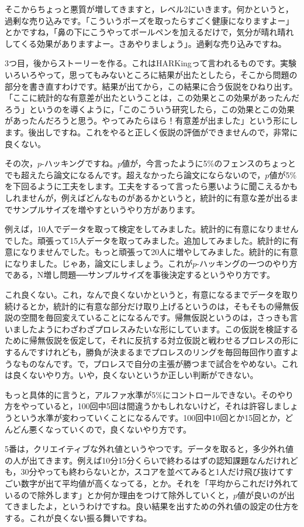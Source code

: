 \documentclass{ltjsbook}
\begin{document}
そこからちょっと悪質が増してきますと，レベル2にいきます。何かというと，過剰な売り込みです。「こういうポーズを取ったらすごく健康になりますよー」とかですね，「鼻の下にこうやってボールペンを加えるだけで，気分が晴れ晴れしてくる効果がありますよー。さあやりましょう」。過剰な売り込みですね。

3つ目，後からストーリーを作る。これはHARKingって言われるものです。実験いろいろやって，思ってもみないところに結果が出たとしたら，そこから問題の部分を書き直すわけです。結果が出てから，この結果に合う仮説をひねり出す。「ここに統計的な有意差が出たということは，この効果とこの効果があったんだろう」というのを導くように，「このこういう研究したら，この効果とこの効果があったんだろうと思う。やってみたらほら！有意差が出ました」という形にします。後出しですね。これをやると正しく仮説の評価ができませんので，非常に良くない。

その次，$p$-ハッキングですね。$p$値が，今言ったように5\%のフェンスのちょっとでも超えたら論文になるんです。超えなかったら論文にならないので，$p$値が5\%を下回るように工夫をします。工夫をするって言ったら悪いように聞こえるかもしれませんが，例えばどんなものがあるかというと，統計的に有意な差が出るまでサンプルサイズを増やすというやり方があります。

例えば，10人でデータを取って検定をしてみました。統計的に有意になりませんでした。頑張って15人データを取ってみました。追加してみました。統計的に有意になりませんでした。もっと頑張って20人に増やしてみました。統計的に有意になりました。じゃあ，論文にしましょう。これが$p$-ハッキングの一つのやり方である，N増し問題──サンプルサイズを事後決定するというやり方です。

これ良くない。これ，なんで良くないかというと，有意になるまでデータを取り続けるとか，統計的に有意な部分だけ取り上げるというのは，そもそもの帰無仮説の空間を毎回変えていることになるんです。帰無仮説というのは，さっきも言いましたようにわざわざプロレスみたいな形にしています。この仮説を検証するために帰無仮説を仮定して，それに反抗する対立仮説と戦わせるプロレスの形にするんですけれども，勝負が決まるまでプロレスのリングを毎回毎回作り直すようなものなんです。で，プロレスで自分の主張が勝つまで試合をやめない。これは良くないやり方。いや，良くないというか正しい判断ができない。

もっと具体的に言うと，アルファ水準が5\%にコントロールできない。そのやり方をやっていると，100回中5回は間違うかもしれないけど，それは許容しましょうという水準が変わっていくことになるんです。100回中10回とか15回とか，どんどん悪くなっていくので，良くないやり方です。

5番は，クリエイティブな外れ値というやつです。データを取ると，多少外れ値の人が出てきます。例えば10分15分くらいで終わるはずの認知課題なんだけれども，30分やっても終わらないとか，スコアを並べてみると1人だけ飛び抜けてすごい数字が出て平均値が高くなってる，とか。それを「平均からこれだけ外れているので除外します」とか何か理由をつけて除外していくと，$p$値が良いのが出てきましたよ，というわけですね。良い結果を出すための外れ値の設定の仕方をする。これが良くない振る舞いですね。
\end{document}
